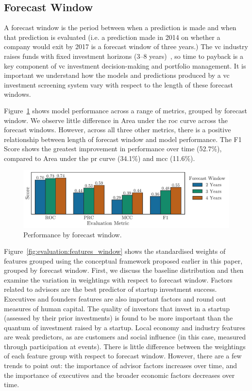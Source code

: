 \documentclass[../thesis/thesis.tex]{subfiles}
\begin{document}
\subsection{Forecast Window}

A forecast window is the period between when a prediction is made and when that prediction is evaluated (i.e. a prediction made in 2014 on whether a company would exit by 2017 is a forecast window of three years.) The \gls{vc} industry raises funds with fixed investment horizons (3--8 years)~\cite{gompers1995}, so time to payback is a key component of \gls{vc} investment decision-making and portfolio management. It is important we understand how the models and predictions produced by a \gls{vc} investment screening system vary with respect to the length of these forecast windows.

Figure~\ref{fig:evaluation:performance_window} shows model performance across a range of metrics, grouped by forecast window. We observe little difference in Area under the \gls{roc} curve across the forecast windows. However, across all three other metrics, there is a positive relationship between length of forecast window and model performance. The F1 Score shows the greatest improvement in performance over time (52.7\%), compared to Area under the \gls{pr} curve (34.1\%) and \gls{mcc} (11.6\%).

\begin{figure}[!htb]
    \centering
    \includegraphics[width=\textwidth]{../figures/evaluation/performance_window}
    \caption[Performance by forecast window]{Performance by forecast window.}
    \label{fig:evaluation:performance_window}
\end{figure}

Figure~\ref{fig:evaluation:features_window} shows the standardised weights of features grouped using the conceptual framework proposed earlier in this paper, grouped by forecast window. First, we discuss the baseline distribution and then examine the variation in weightings with respect to forecast window. Factors related to advisors are the best predictor of startup investment success. Executives and founders features are also important factors and round out measures of human capital. The quality of investors that invest in a startup (assessed by their prior investments) is found to be more important than the quantum of investment raised by a startup. Local economy and industry features are weak predictors, as are customers and social influence (in this case, measured through participation at events). There is little difference between the weightings of each feature group with respect to forecast window. However, there are a few trends to point out: the importance of advisor factors increases over time, and the importance of executives and the broader economic factors decreases over time.
\end{document}
